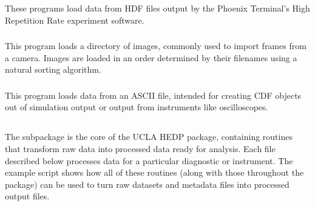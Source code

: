 
\subsubsection{}

These programs load data from HDF files output by the Phoenix Terminal's High Repetition Rate experiment software. 

\subsubsection{}

This program loads a directory of images, commonly used to import frames from a camera. Images are loaded in an order determined by their filenames using a natural sorting algorithm.


\subsubsection{}

This program loads data from an ASCII file, intended for creating CDF objects out of simulation output or output from instruments like oscilloscopes. 



\subsection{}

The  subpackage is the core of the UCLA HEDP package, containing routines that transform raw data into processed data ready for analysis. Each file described below processes data for a particular diagnostic or instrument. The example script  shows how all of these routines (along with those throughout the package) can be used to turn raw datasets and metadata files into processed output files.

\subsubsection{}

